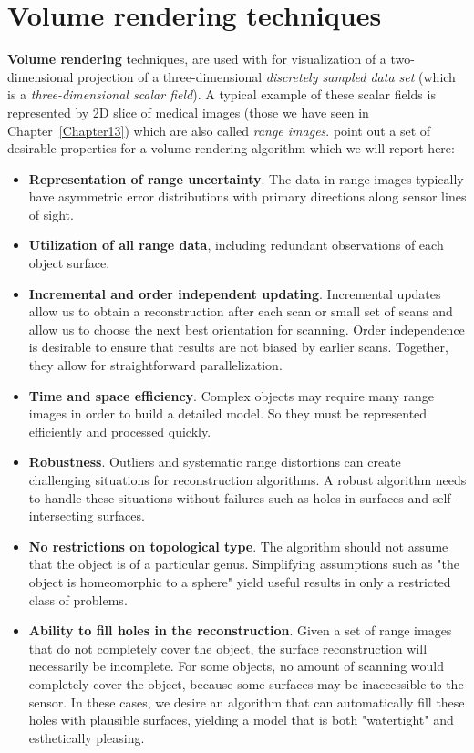 \section{Volume rendering techniques}\label{sec14:volumeRendering}

\textbf{Volume rendering} techniques, are used with for visualization of a two-dimensional projection of a three-dimensional \textit{discretely sampled data set} (which is a \textit{three-dimensional scalar field}). A typical example of these scalar fields is represented by 2D slice of medical images (those we have seen in Chapter~\ref{Chapter13}) which are also called \textit{range images}. \cite{Curless} point out a set of desirable properties for a volume rendering algorithm which we will report here:

\begin{itemize}
\item \textbf{Representation of range uncertainty}. The data in range images typically have asymmetric error distributions with primary directions along sensor lines of sight.
\item \textbf{Utilization of all range data}, including redundant observations of each object surface.
\item \textbf{Incremental and order independent updating}. Incremental updates allow us to obtain a reconstruction after each scan or small set of scans and allow us to choose the next best orientation for scanning. Order independence is desirable to ensure that results are not biased by earlier scans. Together, they allow for straightforward parallelization.
\item \textbf{Time and space efficiency}. Complex objects may require many range images in order to build a detailed model. So they must be represented efficiently and processed quickly.
\item \textbf{Robustness}. Outliers and systematic range distortions can create challenging situations for reconstruction algorithms. A robust algorithm needs to handle these situations without failures such as holes in surfaces and self-intersecting surfaces.
\item \textbf{No restrictions on topological type}. The algorithm should not assume that the object is of a particular genus. Simplifying assumptions such as "the object is homeomorphic to a sphere" yield useful results in only a restricted class of problems.
\item \textbf{Ability to fill holes in the reconstruction}. Given a set of range images that do not completely cover the object, the surface reconstruction will necessarily be incomplete. For some objects, no amount of scanning would completely cover the object, because some surfaces may be inaccessible to the sensor. In these
cases, we desire an algorithm that can automatically fill these holes with plausible surfaces, yielding a model that is both "watertight" and esthetically pleasing.
\end{itemize}

